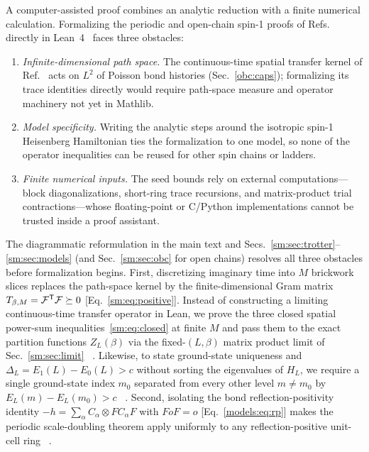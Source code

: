 \label{blueprint:sec:lean}

A computer-assisted proof combines an analytic reduction with a finite
numerical calculation. Formalizing the periodic and open-chain spin-1
proofs of Refs.~\cite{OpenAI2026Periodic,OpenAI2026Boundaryfield}
directly in Lean~4~\cite{Moura2021Lean} faces three obstacles:
\begin{enumerate}
    \item \emph{Infinite-dimensional path space.} The continuous-time
          spatial transfer kernel of Ref.~\cite{OpenAI2026Periodic} acts on
          $L^2$ of Poisson bond histories (Sec.~\ref{obc:caps}); formalizing its
          trace identities directly would require path-space measure and operator
          machinery not yet in Mathlib.
    \item \emph{Model specificity.} Writing the analytic steps around the
          isotropic spin-1 Heisenberg Hamiltonian ties the formalization to one
          model, so none of the operator inequalities can be reused for other
          spin chains or ladders.
    \item \emph{Finite numerical inputs.} The seed bounds rely on external
          computations—block diagonalizations, short-ring trace recursions, and
          matrix-product trial contractions—whose floating-point or C/Python
          implementations cannot be trusted inside a proof assistant.
\end{enumerate}

The diagrammatic reformulation in the main text and
Secs.~\ref{sm:sec:trotter}--\ref{sm:sec:models} (and
Sec.~\ref{sm:sec:obc} for open chains) resolves all three
obstacles before formalization begins. First, discretizing imaginary
time into $M$ brickwork slices replaces the path-space kernel by the
finite-dimensional Gram matrix $T_{\beta,M}=\mathcal F^{\mathsf T}\mathcal F\succeq0$
[Eq.~\eqref{sm:eq:positive}]. Instead of constructing a limiting
continuous-time transfer operator in Lean, we prove the three closed
spatial power-sum inequalities~\eqref{sm:eq:closed} at finite $M$ and
pass them to the exact partition functions $Z_L(\beta)$ via the
fixed-$(L,\beta)$ matrix product limit of Sec.~\ref{sm:sec:limit}%
~.
Likewise, to state ground-state uniqueness and
$\Delta_L=E_1(L)-E_0(L)>c$ without sorting the eigenvalues of $H_L$, we
require a single ground-state index $m_0$ separated from every other
level $m\ne m_0$ by $E_L(m)-E_L(m_0)>c$%
~.
Second, isolating the bond reflection-positivity identity
$-h=\sum_\alpha C_\alpha\otimes FC_\alpha F$ with $FoF=o$
[Eq.~\eqref{models:eq:rp}] makes the periodic scale-doubling theorem
apply uniformly to any reflection-positive unit-cell ring%
~.

